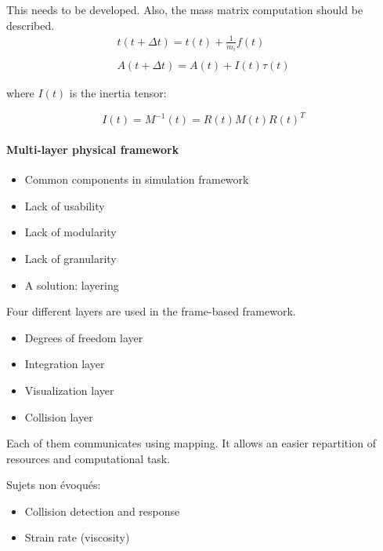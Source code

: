 \documentclass[11pt, oneside, a4paper]{memoir}
\begin{document}
This needs to be developed.
Also, the mass matrix computation should be described.
\begin{equation}
\begin{array}{l}
t(t+\Delta t) = t(t) + \frac{1}{m_{i}}f(t) \\ \\
A(t+\Delta t) = A(t) + I(t)\tau(t)
\end{array}
\end{equation}

where $I(t)$ is the inertia tensor:

\begin{equation}
I(t) = M^{-1}(t) = R(t)M(t)R(t)^{T} 
\end{equation}

\paragraph{Multi-layer physical framework}

\begin{itemize}
\item Common components in simulation framework
\item Lack of usability
\item Lack of modularity
\item Lack of granularity
\item A solution: layering
\end{itemize}

Four different layers are used in the frame-based framework.
\begin{itemize}
\item Degrees of freedom layer
\item Integration layer
\item Visualization layer
\item Collision layer
\end{itemize}

Each of them communicates using mapping.
It allows an easier repartition of resources and computational task.

Sujets non évoqués:
\begin{itemize}
\item Collision detection and response
\item Strain rate (viscosity)
\end{itemize}
\end{document}
